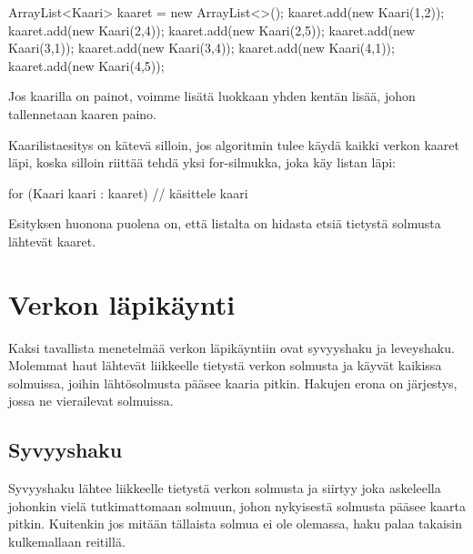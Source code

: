 \begin{code}
ArrayList<Kaari> kaaret = new ArrayList<>();
kaaret.add(new Kaari(1,2));
kaaret.add(new Kaari(2,4));
kaaret.add(new Kaari(2,5));
kaaret.add(new Kaari(3,1));
kaaret.add(new Kaari(3,4));
kaaret.add(new Kaari(4,1));
kaaret.add(new Kaari(4,5));
\end{code}

Jos kaarilla on painot, voimme lisätä luokkaan yhden kentän lisää,
johon tallennetaan kaaren paino.

Kaarilistaesitys on kätevä silloin, jos algoritmin tulee käydä
kaikki verkon kaaret läpi, koska silloin riittää tehdä yksi
for-silmukka, joka käy listan läpi:

\begin{code}
for (Kaari kaari : kaaret) {
    // käsittele kaari
}
\end{code}

Esityksen huonona puolena on, että listalta on hidasta etsiä tietystä
solmusta lähtevät kaaret.

\section{Verkon läpikäynti}

Kaksi tavallista menetelmää verkon läpikäyntiin ovat syvyyshaku ja leveyshaku.
Molemmat haut lähtevät liikkeelle tietystä verkon solmusta ja käyvät
kaikissa solmuissa, joihin lähtösolmusta pääsee kaaria pitkin.
Hakujen erona on järjestys, jossa ne vierailevat solmuissa.

\subsection{Syvyyshaku}

Syvyyshaku lähtee liikkeelle tietystä verkon solmusta ja siirtyy
joka askeleella johonkin vielä tutkimattomaan solmuun,
johon nykyisestä solmusta pääsee kaarta pitkin.
Kuitenkin jos mitään tällaista solmua ei ole olemassa,
haku palaa takaisin kulkemallaan reitillä.

